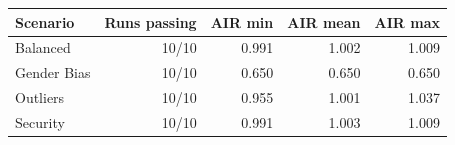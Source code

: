 \AccessibleTableHeaderRow
\begin{tabular}{@{}lrrrr@{}}
\toprule
Scenario & Runs passing & AIR min & AIR mean & AIR max \\
\midrule
Balanced & 10/10 & 0.991 & 1.002 & 1.009 \\
Gender Bias & 10/10 & 0.650 & 0.650 & 0.650 \\
Outliers & 10/10 & 0.955 & 1.001 & 1.037 \\
Security & 10/10 & 0.991 & 1.003 & 1.009 \\
\bottomrule
\end{tabular}
